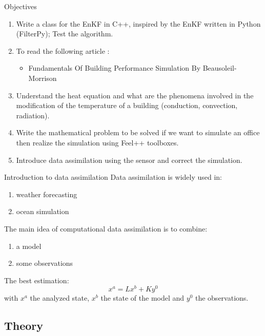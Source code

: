 

\begin{frame}[allowframebreaks]{Objectives}
		
    \begin{enumerate}[\textbullet]
        \item Write a class for the EnKF in C++, inspired by the EnKF written in Python (FilterPy); Test the algorithm.
        \item To read the following article :
        \begin{itemize}
            \item Fundamentals Of Building Performance Simulation By Beausoleil-Morrison
        \end{itemize}
        
    \item Understand the heat equation and what are the phenomena involved in the modification of the temperature of a building (conduction, convection, radiation).
    \item Write the mathematical problem to be solved if we want to simulate an office then realize the simulation using Feel++ toolboxes.
    \item Introduce data assimilation using the sensor and correct the simulation.
    \end{enumerate}
\end{frame}




\begin{frame}{Introduction to data assimilation}
Data assimilation is widely used in:
\begin{enumerate}[\textbullet]
       \item weather forecasting
       \item ocean simulation
\end{enumerate}	 
      The main idea of computational data assimilation is to combine:
\begin{enumerate}[\textbullet]
       \item a model
       \item some observations
\end{enumerate}	 
The best estimation:
$$x^a=Lx^b+Ky^0$$
with $x^a$ the analyzed state, $x^b$ the state of the model and $y^0$ the observations.
\end{frame}
\subsection{Theory}
   
